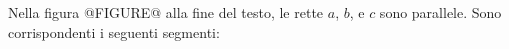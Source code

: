 Nella figura  @FIGURE@ alla fine del testo,
le rette $a$, $b$, e $c$ sono parallele. Sono 
corrispondenti i seguenti segmenti: